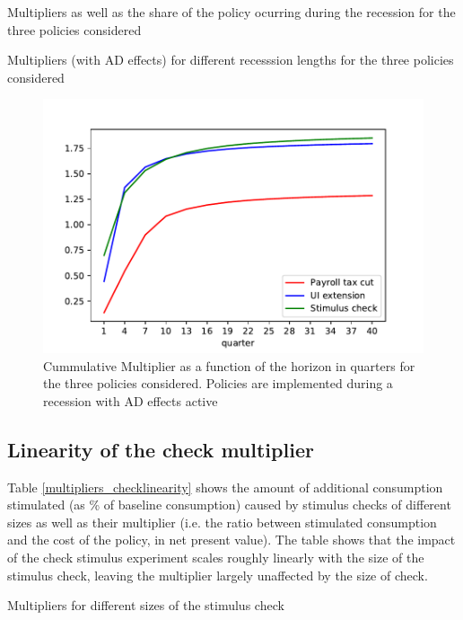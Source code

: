\documentclass[../HAFiscal]{subfiles}
\begin{document}
\begin{table} 
	\center
	
	\caption{Multipliers as well as the share of the policy ocurring during the recession for the three policies considered}
	\label{tab:Multiplier}
\end{table}

\begin{table} 
	\center
	
	\caption{Multipliers (with AD effects) for different recesssion lengths for the three policies considered}
	\label{tab:Multiplier_RecLengths}
\end{table}

\begin{figure}
	\centering
	\includegraphics[width=0.8\linewidth]{Code/HA-Models/FromPandemicCode/Figures/Cummulative_multipliers}
	\caption{Cummulative Multiplier as a function of the horizon in quarters for the three policies considered. Policies are implemented during a recession with AD effects active}
	\label{fig:cummulativemultipliers}
\end{figure}



\subsection{Linearity of the check multiplier}

Table \ref{multipliers_checklinearity} shows the amount of additional consumption stimulated (as \% of baseline consumption) caused by stimulus checks of different sizes as well as their multiplier (i.e. the ratio between stimulated consumption and the cost of the policy, in net present value). The table shows that the impact of the check stimulus experiment scales roughly linearly with the size of the stimulus check, leaving the multiplier largely unaffected by the size of check.

\begin{table} 
	\center
	
	\caption{Multipliers for different sizes of the stimulus check}
	\label{multipliers_checklinearity}
\end{table}
\end{document}
